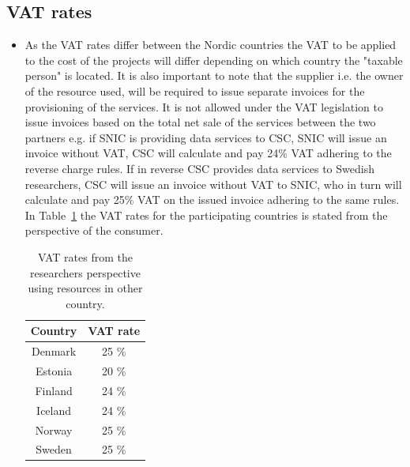 \documentclass{article}
\begin{document}
\subsection{VAT rates}
\begin{itemize}
    \item [] As the VAT rates differ between the Nordic countries the VAT to be applied to the cost of the projects will differ depending on which country the "taxable person" is located. 
    It is also important to note that the supplier i.e. the owner of the resource used, will be required to issue separate invoices for the provisioning of the services. It is not allowed under the VAT legislation to issue invoices based on the total net sale of the services between the two partners e.g. if SNIC is providing data services to CSC, SNIC will issue an invoice without VAT, CSC will calculate and pay 24\% VAT adhering to the reverse charge rules. 
    If in reverse CSC provides data services to Swedish researchers, CSC will issue an invoice without VAT to SNIC, who in turn will calculate and pay 25\% VAT on the issued invoice adhering to the same rules. 
    In Table~\ref{tab:vat_rates} the VAT rates for the participating countries is stated from the perspective of the consumer.
    
    \begin{table}[!h]
    \centering
    \begin{tabular}{|c|c|}
    \hline
     Country & VAT rate \\
        \hline
     Denmark & 25 \%  \\
        \hline
     Estonia & 20 \% \\
             \hline
     Finland & 24 \% \\
             \hline
     Iceland & 24 \% \\
             \hline
     Norway & 25 \% \\
             \hline
     Sweden & 25 \% \\
             \hline
        \end{tabular}
    \caption{VAT rates from the researchers perspective using resources in other country.}
    \label{tab:vat_rates}
\end{table}
\end{itemize}
\end{document}
